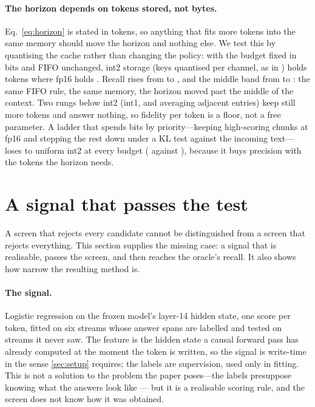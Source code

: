 \documentclass[10pt]{article}
\begin{document}
\paragraph{The horizon depends on tokens stored, not bytes.} Eq.~\eqref{eq:horizon}
is stated in tokens, so anything that fits more tokens into the same memory
should move the horizon and nothing else. We test this by quantising the cache
rather than changing the policy: with the budget fixed in bits and FIFO
unchanged, int2 storage (keys quantised per channel, as in
\citealp{liu2024kivi}) holds \GradedIntTwoLargeTokens{} tokens where fp16 holds
\GradedFpLargeTokens. Recall rises from \GradedFpLarge{} to
\GradedIntTwoLarge{} \GradedIntTwoLargeCI, and the middle band from
\GradedFpLargeMid{} to \GradedIntTwoLargeMid: the same FIFO rule, the same
memory, the horizon moved past the middle of the context. Two rungs below int2
(int1, and averaging adjacent entries) keep still more tokens and answer
nothing, so fidelity per token is a floor, not a free parameter. A ladder that
spends bits by priority---keeping high-scoring chunks at fp16 and stepping the
rest down under a KL test against the incoming text---loses to uniform int2
at every budget (\GradedKlLarge{} against \GradedIntTwoLarge), because it buys
precision with the tokens the horizon needs.

\section{A signal that passes the test}\label{sec:probe}

A screen that rejects every candidate cannot be distinguished from a screen
that rejects everything. This section supplies the missing case: a signal that
is realisable, passes the screen, and then reaches the oracle's recall. It also
shows how narrow the resulting method is.

\paragraph{The signal.} Logistic regression on the frozen model's layer-14
hidden state, one score per token, fitted on six streams whose answer spans are
labelled and tested on streams it never saw. The feature is the hidden state a
causal forward pass has already computed at the moment the token is written, so
the signal is write-time in the sense \cref{sec:setup} requires; the labels
are supervision, used only in fitting. This is not a solution to the problem
the paper poses---the labels presuppose knowing what the answers look like ---
but it is a realisable scoring rule, and the screen does not know how it was
obtained.
\end{document}

